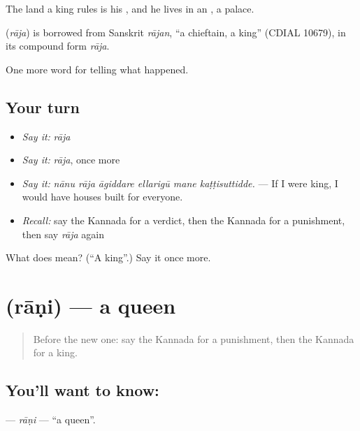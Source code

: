 The land a king rules is his , and he lives in an , a palace.

\begin{cousinweb}
\textbf{} (\emph{rāja}) is borrowed from Sanskrit \emph{rājan}, \textquotedblleft{}a chieftain, a king\textquotedblright{} (CDIAL 10679), in its compound form \emph{rāja}.
\end{cousinweb}

\begin{grammarlens}[title={What you've built}]
One more word for telling what happened.
\end{grammarlens}

\subsection*{Your turn}
\begin{itemize}
\raggedright
  \item \emph{Say it:} \emph{rāja}
  \item \emph{Say it:} \emph{rāja}, once more
  \item \emph{Say it:} \emph{nānu rāja āgiddare ellarigū mane kaṭṭisuttidde.} — If I were king, I would have houses built for everyone.
  \item \emph{Recall:} say the Kannada for a verdict, then the Kannada for a punishment, then say \emph{rāja} again
\end{itemize}

\begin{tcolorbox}[breakable,colback=teal!4,colframe=teal!35!black,title={Before you move on}]
What does  mean? (\textquotedblleft{}A king\textquotedblright{}.) Say it once more.
\end{tcolorbox}
\section[\texorpdfstring{\kn{ರಾಣಿ} (rāṇi)}{ರಾಣಿ (rāṇi)}]{ (rāṇi) — a queen}

\label{lesson:KA-C322-rani}



\begin{quote}
Before the new one: say the Kannada for a punishment, then the Kannada for a king.
\end{quote}

\subsection*{You'll want to know: }
\textbf{} — \emph{rāṇi} — \textquotedblleft{}a queen\textquotedblright{}.

